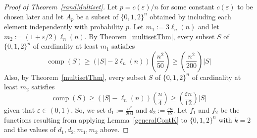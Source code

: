 \documentclass[11 pt]{article}
\theoremstyle{definition}
\theoremstyle{case}
\numberwithin{equation}{section}
\DeclareMathOperator{\comp}{comp}
\begin{document}
\begin{proof}[Proof of Theorem~\ref{randMultiset}]
Let $p=c(\varepsilon)/n$ for some constant $c(\varepsilon)$ to be chosen later and let $A_p$ be a subset of $\{0,1,2\}^n$ obtained by including each element independently with probability $p$. Let $m_1:=3\ell_n(n)$ and let $m_2:=(1+\varepsilon/2)\ell_n(n)$. By Theorem~\ref{multisetThm}, every subset $S$ of $\{0,1,2\}^n$ of cardinality at least $m_1$ satisfies
\[\comp(S)\geq \left(|S|-2\ell_n(n)\right)\left(\frac{n^2}{50}\right)\geq \left(\frac{n^2}{200}\right)|S|\]
Also, by Theorem~\ref{multisetThm}, every subset $S$ of $\{0,1,2\}^n$ of cardinality at least $m_2$ satisfies 
\[\comp(S)\geq \left(|S| - \ell_n(n)\right)\left(\frac{n}{4}\right)\geq  \left(\frac{\varepsilon n}{12}\right) |S|\]
given that $\varepsilon\in(0,1)$.  So, we set $d_1:=\frac{n^2}{200}$ and $d_2:= \frac{\varepsilon n}{12}$. Let $f_1$ and $f_2$ be the functions resulting from applying Lemma~\ref{generalContK} to $\{0,1,2\}^n$ with $k=2$ and the values of $d_1,d_2,m_1,m_2$ above. 


\end{proof}
\end{document}

